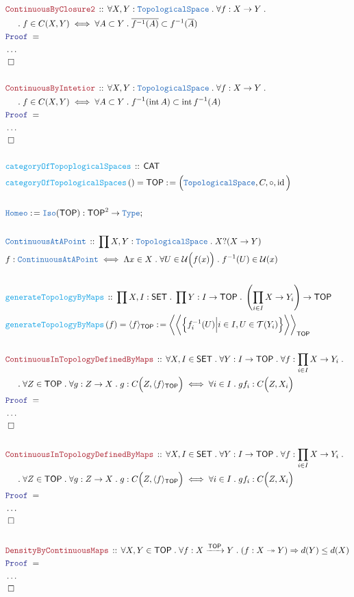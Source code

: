 \documentclass[12pt]{scrartcl}
\newcommand{\TYPE}[1]{\textcolor{NavyBlue}{\mathtt{#1}}}
\newcommand{\FUNC}[1]{\textcolor{Cerulean}{\mathtt{#1}}}
\newcommand{\LOGIC}[1]{\textcolor{Blue}{\mathtt{#1}}}
\newcommand{\THM}[1]{\textcolor{Maroon}{\mathtt{#1}}}
\renewcommand{\.}{\; . \;}
\newcommand{\de}{: \kern 0.1pc =}
\newcommand{\Act}[1]{\left( #1 \right)}
\newcommand{\Theorem}[2]{& \THM{#1} \, :: \, #2 \\ & \Proof = \\ }
\newcommand{\DeclareType}[2]{& \TYPE{#1} \, :: \, #2 \\}
\newcommand{\DefineType}[3]{& #1 : \TYPE{#2} \iff #3 \\}
\newcommand{\DeclareFunc}[2]{& \FUNC{#1} \, :: \, #2 \\}
\newcommand{\DefineNamedFunc}[4]{&  \FUNC{#1}\Act{#2} = #3 \de #4 \\}
\newcommand{\NewLine}{\\ & \kern 1pc}
\newcommand{\Page}[1]{ \begin{align*} #1 \end{align*}   }
\newcommand{\NoProof}{ & \ldots \\ \EndProof}
\newcommand{\Imply}{\Rightarrow}
\newcommand{\Type}{\TYPE{Type}}
\DeclareMathOperator*{\id}{id}
\newcommand{\ToSurj}{\twoheadrightarrow}
\newcommand{\Arrow}{\xrightarrow}
\newcommand{\Conclude}[3]{& #1 \de #2 : #3; \\}
\newcommand{\QED}{\; \square}
\newcommand{\EndProof}{& \QED \\}
\newcommand{\Proof}{\LOGIC{Proof} \; }
\newcommand{\CAT}{\mathsf{CAT}}
\newcommand{\SET}{\mathsf{SET}}
\newcommand{\TS}{\TYPE{TopologicalSpace}}
\DeclareMathOperator*{\intx}{int}
\newcommand{\TOP}{\mathsf{TOP}}
\newcommand{\T}{\mathcal{T}}
\newcommand{\U}{\mathcal{U}}
\begin{document}
\Page{
	\Theorem{ContinuousByClosure2}
	{
		\forall X,Y : \TS \.
		\forall f : X \to Y \.
		\NewLine \.
		f \in C(X,Y) \iff
		\forall A \subset Y \. 
		\overline{f^{-1}(A)} \subset f^{-1}(\overline{A})
	}
	\NoProof
	\\
	\Theorem{ContinuousByIntetior}
	{
		\forall X,Y : \TS \.
		\forall f : X \to Y \.
		\NewLine \.
		f \in C(X,Y) \iff
		\forall A \subset Y \. 
		f^{-1}( \intx A) \subset \intx f^{-1}(A)
	}
	\NoProof
	\\
	\DeclareFunc{categoryOfTopoplogicalSpaces}{\CAT}
	\DefineNamedFunc{categoryOfTopologicalSpaces}
	{  }{\TOP}{\Big( \TS, C,\circ,\id\Big)}
	\\
	\Conclude{\TYPE{Homeo}}{\TYPE{Iso}(\TOP)}{\TOP^2 \to \Type}
	\\
	\DeclareType{ContinuousAtAPoint}
	{ \prod X,Y : \TS \. X  ?(X \to Y) }
	\DefineType{f}{ContinuousAtAPoint}
	{
		\Lambda x \in X \. \forall U \in \U\Big(f(x)\Big) \.
		f^{-1}(U) \in \U(x)
	}
	\\
	\DeclareFunc{generateTopologyByMaps}
	{
		\prod X,I : \SET \. 
		\prod Y : I \to \TOP \.
		\left( \prod_{i \in I} X \to Y_i \right) \to \TOP
	}
	\DefineNamedFunc{generateTopologyByMaps}{f}
	{ \langle f \rangle_\TOP  }
	{  
		\bigg\langle \bigg\langle \Big\{ f_i^{-1}(U) \Big|  i \in I, U \in \T(Y_i)
			\Big\} \bigg\rangle \bigg\rangle_\TOP    
	}
	\\
	\Theorem{ContinuousInTopologyDefinedByMaps}
	{
		\forall X,I \in \SET \.
		\forall Y : I \to \TOP \.
		\forall f :  \prod_{i \in I} X \to Y_i  \.
		\NewLine \.
		\forall Z \in \TOP \.
		\forall g : Z \to  X \.
		g : C\Big( Z, \langle f \rangle_\TOP \Big) \iff
		\forall i \in I \. gf_i :C\Big( Z, X_i \Big)
	}
	\NoProof
	\\
	\Theorem{ContinuousInTopologyDefinedByMaps}
	{
		\forall X,I \in \SET \.
		\forall Y : I \to \TOP \.
		\forall f :  \prod_{i \in I} X \to Y_i  \.
		\NewLine \.
		\forall Z \in \TOP \.
		\forall g : Z \to  X \.
		g : C\Big( Z, \langle f \rangle_\TOP \Big) \iff
		\forall i \in I \. gf_i :C\Big( Z, X_i \Big)
	}
	\NoProof
	\\
	\Theorem{DensityByContinuousMaps}
	{
		\forall X,Y \in \TOP \.
		\forall f : X \Arrow{\TOP} Y \.
		(f : X \ToSurj Y) 
		\Imply
		d(Y) \le d(X)
	}
	\NoProof
}
\end{document}
